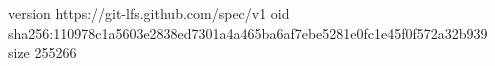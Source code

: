 version https://git-lfs.github.com/spec/v1
oid sha256:110978c1a5603e2838ed7301a4a465ba6af7ebe5281e0fc1e45f0f572a32b939
size 255266
